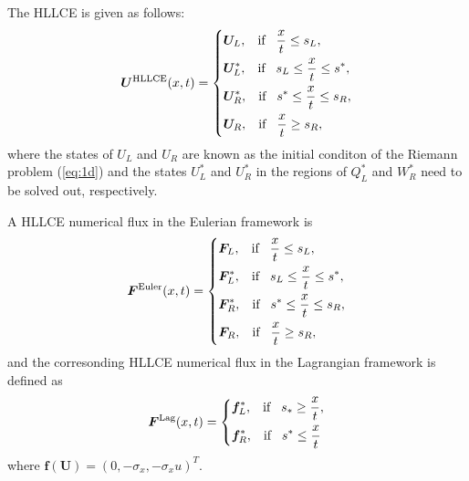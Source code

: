 \documentclass{article}
\theoremstyle{plain}\newtheorem{definition}{\sc{Definition}}
\theoremstyle{defination}\newtheorem{example}{Example}[section]
\numberwithin{equation}{section}
\numberwithin{table}{section}
\begin{document}
  The HLLCE is given as follows:
  \begin{equation}\label{eq:HLLCE}
	\bm{U}^{\text{HLLCE}}(x,t) = \left\{ \begin{aligned}
		& \bm{U}_L, \hspace{0.3cm} \text{if} \hspace{0.3cm} \frac{x}{t}\le s_L, \\
		& \bm{U}_L^*, \hspace{0.3cm} \text{if} \hspace{0.3cm} s_L\le \frac{x}{t} \le s^*, \\
		& \bm{U}_R^*, \hspace{0.3cm} \text{if} \hspace{0.3cm} s^*\le \frac{x}{t} \le s_R,\\
		& \bm{U}_R, \hspace{0.3cm} \text{if} \hspace{0.3cm} \frac{x}{t}\ge s_R, \\
	  \end{aligned}
	\right.
  \end{equation}
  where the states of $U_L$ and $U_R$ are known as the initial conditon of the Riemann problem (\ref{eq:1d}) and the states $U_L^*$ and $U_R^*$ in the regions of $Q_L^*$ and $W_R^*$ need to be solved out, respectively.

A HLLCE numerical flux in the Eulerian framework is 
  \begin{equation}
	\bm{F}^{\text{Euler}}(x,t) = \left\{ \begin{aligned}
		& \bm{F}_L, \hspace{0.3cm} \text{if} \hspace{0.3cm} \frac{x}{t}\le s_L, \\
		& \bm{F}_L^*, \hspace{0.3cm} \text{if} \hspace{0.3cm} s_L\le \frac{x}{t} \le s^*, \\
		& \bm{F}_R^*, \hspace{0.3cm} \text{if} \hspace{0.3cm} s^*\le \frac{x}{t} \le s_R,\\
		& \bm{F}_R, \hspace{0.3cm} \text{if} \hspace{0.3cm} \frac{x}{t}\ge s_R, \\
	  \end{aligned}
	\right.
  \end{equation}
   and the corresonding HLLCE numerical flux in the Lagrangian framework is defined as
\begin{equation}
	\bm{F}^{\text{Lag}}(x,t) = \left\{ \begin{aligned}
		& \bm{f}_L^*, \hspace{0.3cm} \text{if} \hspace{0.3cm} s_*\ge \frac{x}{t},\\
		& \bm{f}_R^*, \hspace{0.3cm} \text{if} \hspace{0.3cm} s^*\le \frac{x}{t}\\
	  \end{aligned}
	\right.
  \end{equation}
  where $\bm{f}(\bm{U}) = (0, -\sigma_x, -\sigma_x u)^T$.
\end{document}
